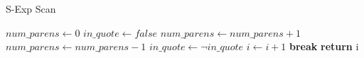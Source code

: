 \begin{algorithm}
\caption{S-Exp Scan}
\label{algo:sexpscan}

\begin{algorithmic}
  \State $num\_parens \gets 0$
  \State $in\_quote \gets false$
        \State $num\_parens \gets num\_parens + 1$
      \EndIf
        \State $num\_parens \gets num\_parens - 1$
      \EndIf
      \State $in\_quote \gets \neg in\_quote$
    \EndIf
    \State $i \gets i + 1$
      \State \textbf{break}
    \EndIf
  \EndWhile
  \State \textbf{return} i
\EndProcedure
\end{algorithmic}
\end{algorithm}

